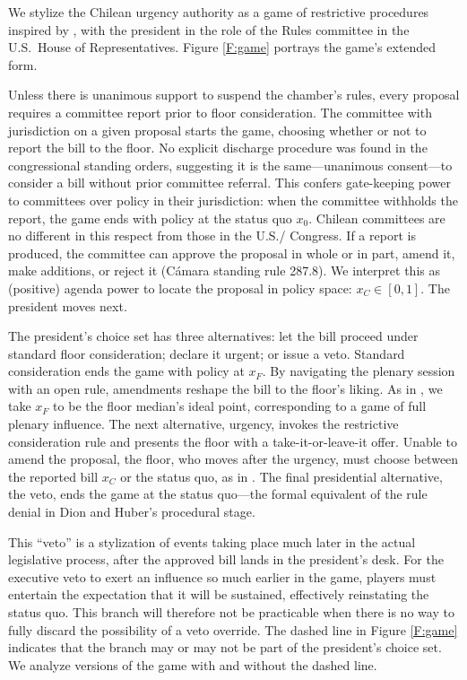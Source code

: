 \documentclass[letter,12pt]{article}
\begin{document}
We stylize the Chilean urgency authority as a game of restrictive procedures inspired by \citet{dion.huber.1996}, with the president in the role of the Rules committee in the U.S.\ House of Representatives. Figure \ref{F:game} portrays the game's extended form.

Unless there is unanimous support to suspend the chamber's rules, every proposal requires a committee report prior to floor consideration. The committee with jurisdiction on a given proposal starts the game, choosing whether or not to report the bill to the floor. No explicit discharge procedure was found in the congressional standing orders, suggesting it is the same---unanimous consent---to consider a bill without prior committee referral. This confers gate-keeping power to committees over policy in their jurisdiction: when the committee withholds the report, the game ends with policy at the status quo $x_0$. Chilean committees are no different in this respect from those in the U.S./ Congress. If a report is produced, the committee can approve the proposal in whole or in part, amend it, make additions, or reject it (Cámara standing rule 287.8). We interpret this as (positive) agenda power to locate the proposal in policy space: $x_C \in [0,1]$. The president moves next. 

The president's choice set has three alternatives: let the bill proceed under standard floor consideration; declare it urgent; or issue a veto. Standard consideration ends the game with policy at $x_F$. By navigating the plenary session with an open rule, amendments reshape the bill to the floor's liking. As in \citet{shepsle.1979}, we take $x_F$ to be the floor median's ideal point, corresponding to a game of full plenary influence. The next alternative, urgency, invokes the restrictive consideration rule and presents the floor with a take-it-or-leave-it offer. Unable to amend the proposal, the floor, who moves after the urgency, must choose between the reported bill $x_C$ or the status quo, as in \citep{romer.rosenthal.1978}. The final presidential alternative, the veto, ends the game at the status quo---the formal equivalent of the rule denial in Dion and Huber's procedural stage.

This ``veto'' is a stylization of events taking place much later in the actual legislative process, after the approved bill lands in the president's desk. For the executive veto to exert an influence so much earlier in the game, players must entertain the expectation that it will be sustained, effectively reinstating the status quo. This branch will therefore not be practicable when there is no way to fully discard the possibility of a veto override. The dashed line in Figure \ref{F:game} indicates that the branch may or may not be part of the president's choice set. We analyze versions of the game with and without the dashed line. 
\end{document}
